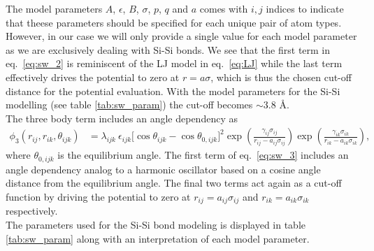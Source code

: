 The model parameters $A$, $\epsilon$, $B$, $\sigma$, $p$, $q$ and $a$ comes with
$i,j$ indices to indicate that theese parameters should be specified for each
unique pair of atom types. However, in our case we will only provide a single
value for each model parameter as we are exclusively dealing with Si-Si bonds.
We see that the first term in eq.~\eqref{eq:sw_2} is reminiscent of the LJ model
in eq.~\eqref{eq:LJ} while the last term effectively drives the potential to
zero at $r=a\sigma$, which is thus the chosen cut-off distance for the potential
evaluation. With the model parameters for the Si-Si modelling (see table
\ref{tab:sw_param}) the cut-off becomes $\sim 3.8$ Å. \\
The three body term includes an angle dependency as
\begin{align}
  \phi_3(r_{ij}, r_{ik}, \theta_{ijk}) &= \lambda_{ijk} \ \epsilon_{ijk} \Big[\cos \theta_{ijk}-\cos \theta_{0,ijk}\Big]^2 \exp (\frac{\gamma_{ij} \sigma_{ij}}{r_{ij} - a_{ij} \sigma_{ij}}) \exp (\frac{\gamma_{ik} \sigma_{ik}}{r_{ik} - a_{ik} \sigma_{ik}}),
  \label{eq:sw_3}
\end{align}
where $\theta_{0,ijk}$ is the equilibrium angle. The first term of
eq.~\eqref{eq:sw_3} includes an angle dependency analog to a harmonic oscillator
based on a cosine angle distance from the equilibrium angle. The final two terms
act again as a cut-off function by driving the potential to zero at $r_{ij} =
a_{ij}\sigma_{ij}$ and $r_{ik} = a_{ik}\sigma_{ik}$ respectively. \\ 
The parameters used for the Si-Si bond modeling is displayed in table
\ref{tab:sw_param} along with an interpretation of each model parameter.



